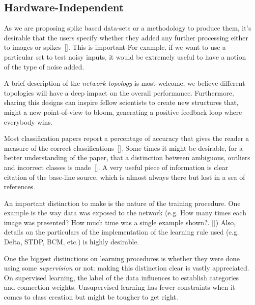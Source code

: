 \subsection{Hardware-Independent}
As we are proposing spike based data-sets or a methodology to produce them, it's desirable that the users specify whether they added any further processing either to images or spikes~[\cite{best-practice-nn-img}]. This is important For example, if we want to use a particular set to test noisy inputs, it would be extremely useful to have a notion of the type of noise added.


A brief description of the \emph{network topology} is most welcome, we believe different topologies will have a deep impact on the overall performance. Furthermore, sharing this designs can inspire fellow scientists to create new structures that, might  a new point-of-view to bloom, generating a positive feedback loop where everybody wins.

Most classification papers report a percentage of accuracy that gives the reader a measure of the correct classifications~[\cite{dietterich1998approximate}]. Some times it might be desirable, for a better understanding of the paper, that a distinction between ambiguous, outliers and incorrect classes is made~[\cite{liu2002performance}]. A very useful piece of information is clear citation of the base-line source, which is almost always there but lost in a sea of references.




An important distinction to make is the nature of the training procedure. One example is the way data was exposed to the network (e.g. How many times each image was presented? How much time was a single example shown?. [\cite{Diehl2015unsupervised}]) Also, details on the particulars of the implementation of the learning rule used (e.g. Delta, STDP, BCM, etc.) is highly desirable. 

One the biggest distinctions on learning procedures is whether they were done using some \emph{supervision} or not; making this distinction clear is vastly appreciated. On supervised learning, the label of the data influences to establish categories and connection weights. Unsupervised learning has fewer constraints when it comes to class creation but might be tougher to get right. 

